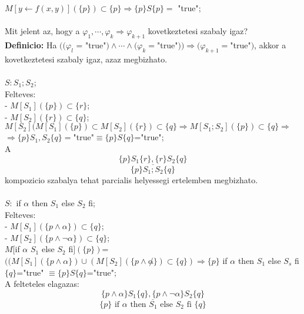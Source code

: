\documentclass[a4paper,10pt]{article}
\begin{document}
$M[y\leftarrow f(x,y)](\lbrace p\rbrace)\subset \lbrace p\rbrace \Rightarrow \lbrace p\rbrace S \lbrace p\rbrace=$ "true";\\\\
Mit jelent az, hogy a $\varphi_1, \cdots, \varphi_k \Longrightarrow \varphi_{k+1}$ kovetkeztetesi szabaly igaz?\\
\textbf{Definicio:} Ha $((\varphi_l$ = "true"$) \wedge \cdots \wedge (\varphi_k=$"true"$)) \Rightarrow (\varphi_{k+1} = $"true"$)$, akkor a kovetkeztetesi szabaly igaz, azaz megbizhato.\\
\\
$S:S_1;S_2$;\\
Felteves:\\
\indent - $M[S_1](\lbrace p\rbrace) \subset \lbrace r\rbrace$;\\
\indent - $M[S_2](\lbrace r\rbrace) \subset \lbrace q\rbrace$;\\
$M[S_2](M[S_1](\lbrace p\rbrace) \subset M[S_2](\lbrace r\rbrace) \subset \lbrace q\rbrace \Rightarrow M[S_1;S_2](\lbrace p\rbrace) \subset \lbrace q\rbrace \Rightarrow$\\
$\Rightarrow \lbrace p\rbrace S_1, S_2 \lbrace q\rbrace =$"true"$ \equiv \lbrace p\rbrace S\lbrace q\rbrace$="true";\\
A
$$\underline{\lbrace p\rbrace S_1 \lbrace r\rbrace, \lbrace r\rbrace S_2\lbrace q\rbrace}$$
$$\lbrace p\rbrace S_1;S_2 \lbrace q\rbrace$$
kompozicio szabalya tehat parcialis helyessegi ertelemben megbizhato.\\
\\
$S:$ if $\alpha$ then $S_1$ else $S_2$ fi;\\
Felteves:\\
\indent - $M[S_1](\lbrace p\wedge \alpha\rbrace) \subset\lbrace q\rbrace$;\\
\indent - $M[S_2](\lbrace p\wedge \neg\alpha\rbrace)\subset\lbrace q\rbrace$;\\
$M[$if $\alpha$ $S_1$ else $S_2$ fi$](\lbrace p\rbrace)$=\\
$((M[S_1](\lbrace p\wedge\alpha\rbrace)\cup(M[S_2](\lbrace p\wedge\not\alpha\rbrace)\subset\lbrace q\rbrace) \Rightarrow \lbrace p\rbrace$ if $\alpha$ then $S_1$ else $S_s$ fi $\lbrace q\rbrace$="true" $\equiv \lbrace p\rbrace S \lbrace q\rbrace$="true";\\
A felteteles elagazas:
$$\underline{\lbrace p\wedge\alpha\rbrace S_1 \lbrace q\rbrace, \lbrace p\wedge\neg\alpha\rbrace S_2 \lbrace q\rbrace}$$
$$\lbrace p\rbrace \text{ if } \alpha \text{ then } S_1 \text{ else } S_2 \text{ fi } \lbrace q\rbrace$$
\end{document}
